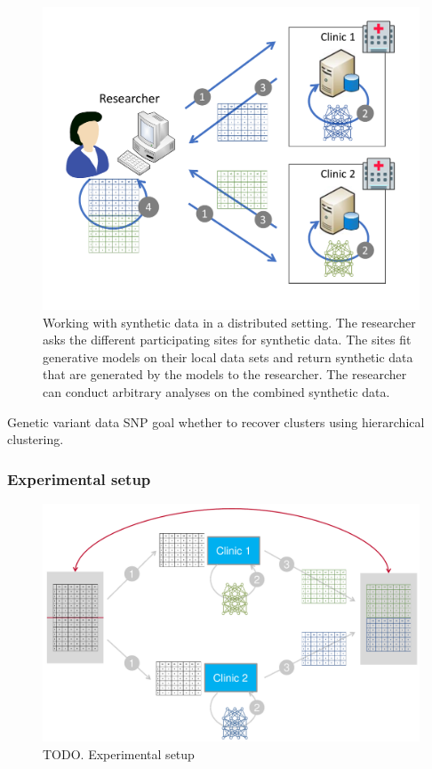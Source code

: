 \documentclass[12pt]{article}
\newcommand{\circlenum}[1]{\raisebox{.5pt}{\textcircled{\raisebox{-.9pt} {#1}}}}
\begin{document}
\begin{figure}[h]
   \centering
   \includegraphics[scale=0.7]{images/synthetic_data_principle.pdf}
   \caption{Working with synthetic data in a distributed setting. \circlenum{1}The researcher asks the different participating sites for synthetic data. \circlenum{2}The sites fit generative models on their local data sets and \circlenum{3} return synthetic data that are generated by the models to the researcher. \circlenum{4}The researcher can conduct arbitrary analyses on the combined synthetic data.}
   \label{fig:syntheticdataprinciple}
 \end{figure}
 

Genetic variant data
SNP
goal whether to recover clusters using hierarchical clustering.

\subsubsection{Experimental setup}

\begin{figure}[h]
   \centering
   \includegraphics[scale=0.7]{images/experimentalsetup.pdf}
   \caption{TODO. Experimental setup}
   \label{fig:experimentalsetup}
 \end{figure}
\end{document}
